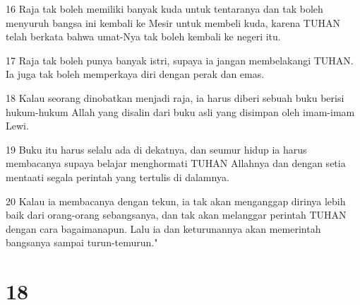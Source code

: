 \par 16 Raja tak boleh memiliki banyak kuda untuk tentaranya dan tak boleh menyuruh bangsa ini kembali ke Mesir untuk membeli kuda, karena TUHAN telah berkata bahwa umat-Nya tak boleh kembali ke negeri itu.
\par 17 Raja tak boleh punya banyak istri, supaya ia jangan membelakangi TUHAN. Ia juga tak boleh memperkaya diri dengan perak dan emas.
\par 18 Kalau seorang dinobatkan menjadi raja, ia harus diberi sebuah buku berisi hukum-hukum Allah yang disalin dari buku asli yang disimpan oleh imam-imam Lewi.
\par 19 Buku itu harus selalu ada di dekatnya, dan seumur hidup ia harus membacanya supaya belajar menghormati TUHAN Allahnya dan dengan setia mentaati segala perintah yang tertulis di dalamnya.
\par 20 Kalau ia membacanya dengan tekun, ia tak akan menganggap dirinya lebih baik dari orang-orang sebangsanya, dan tak akan melanggar perintah TUHAN dengan cara bagaimanapun. Lalu ia dan keturunannya akan memerintah bangsanya sampai turun-temurun."

\chapter{18}


